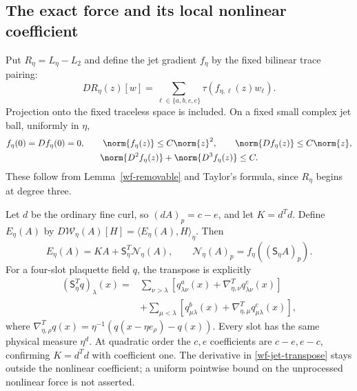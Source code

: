 \subsection{The exact force and its local nonlinear coefficient}

Put $R_\eta=L_\eta-L_2$ and define the jet gradient $f_\eta$
by the fixed bilinear trace pairing:
\begin{equation}\label{wf-gradient-definition}
 DR_\eta(z)[w]=\sum_{\ell\in\{a,b,c,e\}}
                                \tau(f_{\eta,\ell}(z)w_\ell).
\end{equation}
Projection onto the fixed traceless space is included. On a
fixed small complex jet ball, uniformly in $\eta$,
\begin{equation}\label{wf-pointwise-bounds}
 \begin{gathered}
 f_\eta(0)=Df_\eta(0)=0,\qquad
 \norm{f_\eta(z)}\le C\norm{z}^2,\qquad
 \norm{Df_\eta(z)}\le C\norm{z},\\
 \norm{D^2f_\eta(z)}+\norm{D^3f_\eta(z)}\le C.
 \end{gathered}
\end{equation}
These follow from Lemma~\ref{wf-removable} and Taylor's
formula, since $R_\eta$ begins at degree three.

Let $d$ be the ordinary fine curl, so $(dA)_p=c-e$, and
let $K=d^Td$. Define $E_\eta(A)$ by
$D\mathcal W_\eta(A)[H]=\langle E_\eta(A),H\rangle_\eta$.
Then
\begin{equation}\label{wf-force-factorization}
 E_\eta(A)=KA+\mathsf S_\eta^T\mathcal N_\eta(A),
 \qquad
 \mathcal N_\eta(A)_p=f_\eta((\mathsf S_\eta A)_p).
\end{equation}
For a four-slot plaquette field $q$, the transpose is
explicitly
\begin{equation}\label{wf-jet-transpose}
 \begin{split}
 (\mathsf S_\eta^Tq)_\lambda(x)
 ={}&\sum_{\nu>\lambda}\left[
       q_{\lambda\nu}^{a}(x)
                +\nabla_{\eta,\nu}^Tq_{\lambda\nu}^{e}(x)\right]\\
 &+\sum_{\mu<\lambda}\left[
       q_{\mu\lambda}^{b}(x)
                +\nabla_{\eta,\mu}^Tq_{\mu\lambda}^{c}(x)\right],
 \end{split}
\end{equation}
where $\nabla_{\eta,\rho}^Tq(x)
=\eta^{-1}(q(x-\eta e_\rho)-q(x))$. Every slot has the same
physical measure $\eta^d$. At quadratic order the $c,e$
coefficients are $c-e,e-c$, confirming $K=d^Td$ with
coefficient one. The derivative in
\eqref{wf-jet-transpose} stays outside the nonlinear
coefficient; a uniform pointwise bound on the unprocessed
nonlinear force is not asserted.


